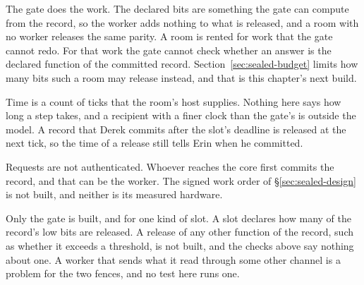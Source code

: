 \begin{pdboundary}
\setlength{\parskip}{4pt plus 1pt}
The gate does the work. The declared bits are something the gate can
compute from the record, so the worker adds nothing to what is released,
and a room with no worker releases the same parity. A room is rented for
work that the gate cannot redo. For that work the gate cannot check
whether an answer is the declared function of the committed record.
Section~\ref{sec:sealed-budget} limits how many bits such a room may
release instead, and that is this chapter's next build.

Time is a count of ticks that the room's host supplies. Nothing here says
how long a step takes, and a recipient with a finer clock than the gate's
is outside the model. A record that Derek commits after the slot's
deadline is released at the next tick, so the time of a release still
tells Erin when he committed.

Requests are not authenticated. Whoever reaches the core first commits
the record, and that can be the worker. The signed work order of
\S\ref{sec:sealed-design} is not built, and neither is its measured
hardware.

Only the gate is built, and for one kind of slot. A slot declares how
many of the record's low bits are released. A release of any other
function of the record, such as whether it exceeds a threshold, is not
built, and the checks above say nothing about one. A worker that sends what it read
through some other channel is a problem for the two fences, and no test
here runs one.
\end{pdboundary}
